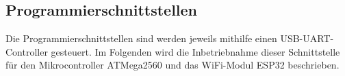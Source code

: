 \newpage
\subsection{Programmierschnittstellen}
\label{sec:Inbetriebnahme_Programmierschnittstellen}

Die Programmierschnittstellen sind werden jeweils mithilfe einen USB-UART-Controller gesteuert. Im Folgenden wird die Inbetriebnahme dieser Schnittstelle für den Mikrocontroller ATMega2560 und das WiFi-Modul ESP32 beschrieben.